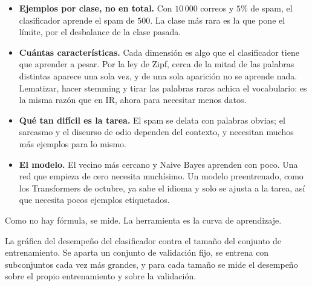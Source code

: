 \documentclass[11pt,letterpaper]{article}
\begin{document}
\begin{itemize}[itemsep=0.3em]
    \item \textbf{Ejemplos por clase, no en total.} Con $10\,000$
          correos y $5\%$ de spam, el clasificador aprende el spam de
          $500$. La clase más rara es la que pone el límite, por el
          desbalance de la clase pasada.
    \item \textbf{Cuántas características.} Cada dimensión es algo
          que el clasificador tiene que aprender a pesar. Por la ley
          de Zipf, cerca de la mitad de las palabras distintas
          aparece una sola vez, y de una sola aparición no se aprende
          nada. Lematizar, hacer stemming y tirar las palabras raras
          achica el vocabulario: es la misma razón que en IR, ahora
          para necesitar menos datos.
    \item \textbf{Qué tan difícil es la tarea.} El spam se delata con
          palabras obvias; el sarcasmo y el discurso de odio dependen
          del contexto, y necesitan muchos más ejemplos para lo mismo.
    \item \textbf{El modelo.} El vecino más cercano y Naive Bayes
          aprenden con poco. Una red que empieza de cero necesita
          muchísimo. Un modelo preentrenado, como los Transformers de
          octubre, ya sabe el idioma y solo se ajusta a la tarea, así
          que necesita pocos ejemplos etiquetados.
\end{itemize}

Como no hay fórmula, se mide. La herramienta es la curva de
aprendizaje.

\begin{definicion}
    La gráfica del desempeño del clasificador contra el tamaño del
    conjunto de entrenamiento. Se aparta un conjunto de validación
    fijo, se entrena con subconjuntos cada vez más grandes, y para
    cada tamaño se mide el desempeño sobre el propio entrenamiento y
    sobre la validación.
\end{definicion}
\end{document}
